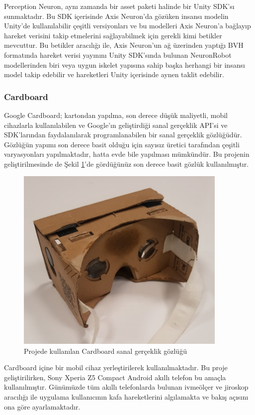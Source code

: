 \documentclass[a4paper, 12pt, titlepage]{article}
\begin{document}
Perception Neuron, aynı zamanda bir asset paketi halinde bir Unity SDK’sı sunmaktadır. Bu SDK
içerisinde Axis Neuron’da gözüken insansı modelin Unity’de kullanılabilir çeşitli versiyonları ve
bu modelleri Axis Neuron’a bağlayıp hareket verisini takip etmelerini sağlayabilmek için gerekli
kimi betikler mevcuttur. Bu betikler aracılığı ile, Axis Neuron’un ağ üzerinden yaptığı BVH
formatında hareket verisi yayınını Unity SDK’sında bulunan NeuronRobot modellerinden biri veya
uygun iskelet yapısına sahip başka herhangi bir insansı model takip edebilir ve hareketleri Unity
içerisinde aynen taklit edebilir.

\subsubsection{Cardboard}
Google Cardboard; kartondan yapılma, son derece düşük maliyetli, mobil cihazlarla kullanılabilen ve
Google’ın geliştirdiği sanal gerçeklik API’si ve SDK’larından faydalanılarak programlanabilen bir
sanal gerçeklik gözlüğüdür. Gözlüğün yapımı son derece basit olduğu için sayısız üretici tarafından
çeşitli varyasyonları yapılmaktadır, hatta evde bile yapılması mümkündür. Bu projenin
geliştirilmesinde de Şekil \ref{cbjpeg}’de gördüğünüz son derece basit gözlük kullanılmıştır.

\begin{figure}
    \centering
        \includegraphics[width=4in]{images/cbjpeg}
    \caption{Projede kullanılan Cardboard sanal gerçeklik gözlüğü}   
    \label{cbjpeg}
\end{figure}

Cardboard içine bir mobil cihaz yerleştirilerek kullanılmaktadır. Bu proje geliştirilirken, Sony
Xperia Z5 Compact Android akıllı telefon bu amaçla kullanılmıştır. Günümüzde tüm akıllı
telefonlarda bulunan ivmeölçer ve jiroskop aracılığı ile uygulama kullanıcının kafa hareketlerini
algılamakta ve bakış açısını ona göre ayarlamaktadır.
\end{document}
